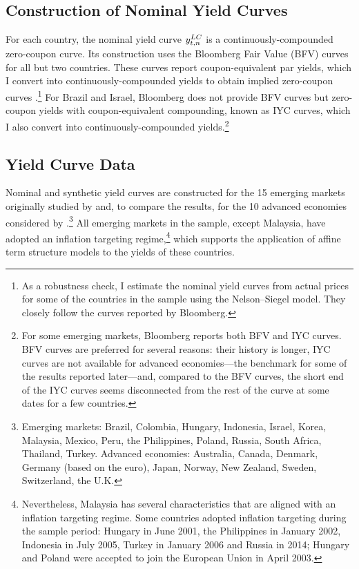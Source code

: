{\subsection{Construction of Nominal Yield Curves} \label{sec:YCnom}
\iftoggle{toclinks}{\gototoc}{} %

For each country, the nominal yield curve \(y_{t,n} ^{LC}\) is a continuously-compounded zero-coupon curve. 
Its construction uses the Bloomberg Fair Value (BFV) curves for all but two countries. 
These curves report coupon-equivalent par yields, which I convert into continuously-compounded yields to obtain implied zero-coupon curves \citep[see][]{GSW:2007}.\footnote{As a robustness check, I estimate the nominal yield curves from actual prices for some of the countries in the sample using the Nelson--Siegel model. They closely follow the curves reported by Bloomberg.} 
For Brazil and Israel, Bloomberg does not provide BFV curves but zero-coupon yields with coupon-equivalent compounding, known as IYC curves, which I also convert into continuously-compounded yields.\footnote{ For some emerging markets, Bloomberg reports both BFV and IYC curves. BFV curves are preferred for several reasons: their history is longer, IYC curves are not available for advanced economies---the benchmark for some of the results reported later---and, compared to the BFV curves, the short end of the IYC curves seems disconnected from the rest of the curve at some dates for a few countries.} 


\subsection{Yield Curve Data}
\iftoggle{toclinks}{\gototoc}{} %

Nominal and synthetic yield curves are constructed for the 15 emerging markets originally studied by \cite{DuSchreger:2016JoF} and, to compare the results, for the 10 advanced economies considered by \cite{DuImSchreger:2018JIE}.\footnote{ Emerging markets: Brazil, Colombia, Hungary, Indonesia, Israel, Korea, Malaysia, Mexico, Peru, the Philippines, Poland, Russia, South Africa, Thailand, Turkey. Advanced economies: Australia, Canada, Denmark, Germany (based on the euro), Japan, Norway, New Zealand, Sweden, Switzerland, the U.K.} 
All emerging markets in the sample, except Malaysia, have adopted an inflation targeting regime,\footnote{ Nevertheless, Malaysia has several characteristics that are aligned with an inflation targeting regime. Some countries adopted inflation targeting during the sample period: Hungary in June 2001, the Philippines in January 2002, Indonesia in July 2005, Turkey in January 2006 and Russia in 2014; Hungary and Poland were accepted to join the European Union in April 2003.} which supports the application of affine term structure models to the yields of these countries. 

}
